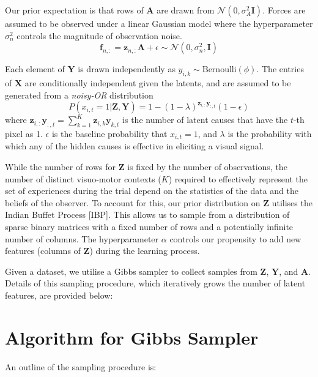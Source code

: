 \documentclass[]{article}
\begin{document}
Our prior expectation is that rows of $\mathbf{A}$ are drawn from $\mathcal{N}(0, \sigma^2_A \mathbf{I})$. Forces are assumed to be observed under a linear Gaussian model where the hyperparameter $\sigma^2_n$ controls the magnitude of observation noise. 
\begin{equation*}
	\mathbf{f}_{n,:} = \mathbf{z}_{n,:}\mathbf{A} + \epsilon \sim \mathcal{N}(0, \sigma^2_n, \mathbf{I})
\end{equation*}

Each element of $\mathbf{Y}$ is drawn independently as $y_{i,k} \sim \text{Bernoulli}(\phi)$. The entries of $\mathbf{X}$ are conditionally independent given the latents, and are assumed to be generated from a \textit{noisy-OR} distribution
\begin{equation*}
	P(x_{i,t} = 1 | \mathbf{Z}, \mathbf{Y}) = 1 - (1-\lambda)^{\mathbf{z}_{i,:}\mathbf{y}_{:,t}}(1-\epsilon)
\end{equation*}
where $\mathbf{z}_{i,:}\mathbf{y}_{:,t} = \sum_{k=1}^{K} \mathbf{z}_{i,k}\mathbf{y}_{k,t}$ is the number of latent causes that have the $t$-th pixel as 1. $\epsilon$ is the baseline probability that $x_{i,t} = 1$, and $\lambda$ is the probability with which any of the hidden causes is effective in eliciting a visual signal. 

While the number of rows for $\mathbf{Z}$ is fixed by the number of observations, the number of distinct visuo-motor contexts ($K$) required to effectively represent the set of experiences during the trial depend on the statistics of the data and the beliefs of the observer. To account for this, our prior distribution on $\mathbf{Z}$ utilises the Indian Buffet Process [IBP]. This allows us to sample from a distribution of sparse binary matrices with a fixed number of rows and a potentially infinite number of columns. The hyperparameter $\alpha$ controls our propensity to add new features (columns of $\mathbf{Z}$) during the learning process.

Given a dataset, we utilise a Gibbs sampler to collect samples from $\mathbf{Z}$, $\mathbf{Y}$, and $\mathbf{A}$. Details of this sampling procedure, which iteratively grows the number of latent features, are provided below:

\newpage
\section{Algorithm for Gibbs Sampler}
An outline of the sampling procedure is:
\end{document}
